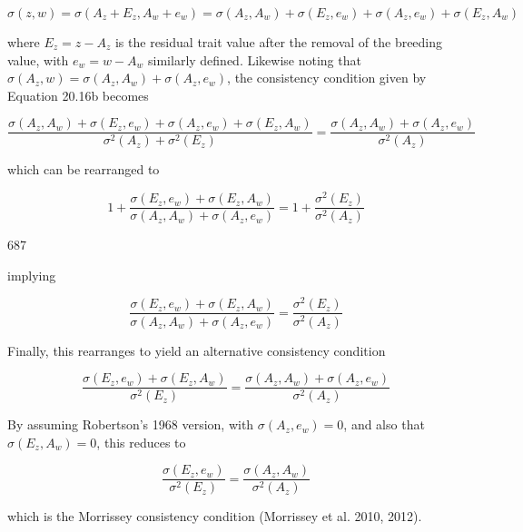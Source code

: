 \documentclass{article}
\begin{document}
\begin{equation}
\sigma(z,w)=\sigma(A_{z}+E_{z},A_{w}+e_{w})=\sigma(A_{z},A_{w})+\sigma(E_{z},e_{w})+\sigma(A_{z},e_{w})+\sigma(E_{z},A_{w})
\end{equation}

where  $ E_z = z - A_z $ is the residual trait value after the removal of the breeding value, with  $ e_w = w - A_w $ similarly defined. Likewise noting that  $ \sigma(A_z, w) = \sigma(A_z, A_w) + \sigma(A_z, e_w) $, the consistency condition given by Equation 20.16b becomes

\begin{equation}
\frac{\sigma(A_{z},A_{w})+\sigma(E_{z},e_{w})+\sigma(A_{z},e_{w})+\sigma(E_{z},A_{w})}{\sigma^{2}(A_{z})+\sigma^{2}(E_{z})}=\frac{\sigma(A_{z},A_{w})+\sigma(A_{z},e_{w})}{\sigma^{2}(A_{z})}
\tag{20.21a}
\label{eq:20_21a}
\end{equation}

which can be rearranged to

\begin{equation}
1+\frac{\sigma(E_{z},e_{w})+\sigma(E_{z},A_{w})}{\sigma(A_{z},A_{w})+\sigma(A_{z},e_{w})}=1+\frac{\sigma^{2}(E_{z})}{\sigma^{2}(A_{z})}
\end{equation}

687

implying

\begin{equation}
\frac{\sigma(E_{z},e_{w})+\sigma(E_{z},A_{w})}{\sigma(A_{z},A_{w})+\sigma(A_{z},e_{w})}=\frac{\sigma^{2}(E_{z})}{\sigma^{2}(A_{z})}
\end{equation}

Finally, this rearranges to yield an alternative consistency condition

\begin{equation}
\frac{\sigma(E_{z},e_{w})+\sigma(E_{z},A_{w})}{\sigma^{2}(E_{z})}=\frac{\sigma(A_{z},A_{w})+\sigma(A_{z},e_{w})}{\sigma^{2}(A_{z})}
\tag{20.21b}
\label{eq:20_21b}
\end{equation}

By assuming Robertson’s 1968 version, with  $ \sigma(A_{z}, e_{w}) = 0 $, and also that  $ \sigma(E_{z}, A_{w}) = 0 $, this reduces to

\begin{equation}
\frac{\sigma(E_{z},e_{w})}{\sigma^{2}(E_{z})}=\frac{\sigma(A_{z},A_{w})}{\sigma^{2}(A_{z})}
\tag{20.21c}
\label{eq:20_21c}
\end{equation}

which is the Morrissey consistency condition (Morrissey et al. 2010, 2012).
\end{document}
